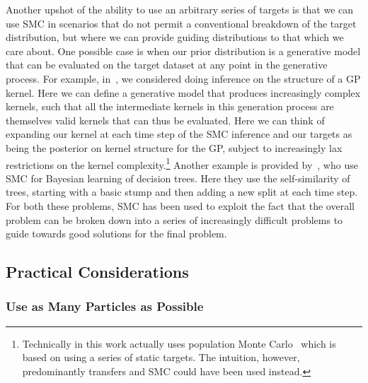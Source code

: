 Another upshot of the ability to use an arbitrary series of targets is that we can use SMC in scenarios that do not
permit a conventional breakdown of the target distribution, but where we 
can provide guiding distributions to that which we care about.  One possible case is when our prior distribution
is a generative model that can be evaluated on the target dataset at any point in the generative process.
For example, in~\cite{janz2016probstruct}, we considered doing inference
on the structure of a GP kernel.  Here we can define a generative model that produces
increasingly complex kernels, such that all the intermediate kernels in this generation process are themselves
valid kernels that can thus be evaluated.  Here we can think of expanding our kernel at each time step of 
the SMC inference and our targets as being the posterior on kernel structure for the GP, subject to increasingly
lax restrictions on the kernel complexity.\footnote{Technically in this work actually uses population
	Monte Carlo~\citep{cappe2004population} which is based on using a series of static targets.  The
	intuition, however, predominantly transfers and SMC could have been used instead.}  
Another example is provided by~\cite{lakshminarayanan2013top},
who use SMC for Bayesian learning of decision trees.  Here they use the self-similarity of trees, starting
with a basic stump and then adding a new split at each time step.
For both these problems, SMC has been used
to exploit the fact that the overall problem can be broken down into a series of increasingly difficult
problems to guide towards good solutions for the final problem.

\subsection{Practical Considerations}
\label{sec:part:smc:prat}

\subsubsection{Use as Many Particles as Possible}
\label{sec:part:smc:prat:part}

